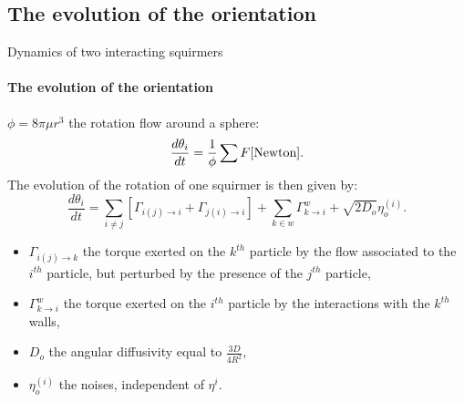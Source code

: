 \documentclass{beamer}
\begin{document}
\subsection{The evolution of the orientation}
\begin{frame}{Dynamics of two interacting squirmers}
        \framesubtitle{The evolution of the orientation}
        $\phi = 8\pi\mu r^3$ the rotation flow around a sphere\cite{Stokes}:
$$\frac{d \theta_i}{dt} = \frac{1}{\phi}\sum F\cite{Newton}.$$
    The evolution of the rotation of one squirmer is then given by: 
    $$
    \frac{d \theta_i}{dt} = \sum\limits_{i\ne j} \left[\Gamma_{i(j)\rightarrow i} + \Gamma_{j(i)\rightarrow i}\right] + \sum\limits_{k\in w} \Gamma_{k\rightarrow i}^w + \sqrt{2D_o} \eta_o^{(i)}.
    $$ 
    \begin{itemize}
        \item $\Gamma_{i(j)\rightarrow k}$ the torque exerted on the $k^{th}$ particle by the flow associated to the $i^{th}$ particle, but perturbed by the presence of the $j^{th}$ particle,
        \item $\Gamma_{k\rightarrow i}^w$ the torque exerted on the $i^{th}$ particle by the interactions with the $k^{th}$ walls,
        \item $D_o$ the angular diffusivity equal to $\frac{3D}{4R^2}$,
        \item $\eta_o^{(i)}$ the noises, independent of $\eta^{i}$.
    \end{itemize}
\end{frame}
\end{document}
